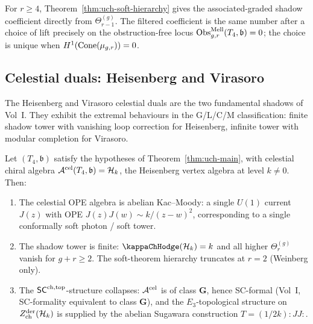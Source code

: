 \begin{remark}
\label{rem:uch-fm103-resolution}
For $r\geq 4$, Theorem~\ref{thm:uch-soft-hierarchy} gives the
associated-graded shadow coefficient directly from
\(\Theta^{(g)}_{r-1}\). The filtered coefficient is the same number
after a choice of lift precisely on the obstruction-free locus
$\operatorname{Obs}^{\mathrm{Mell}}_{g,r}(T_4,\mathfrak b)=0$; the choice is unique
when $H^1(\operatorname{Cone}(\mu_{g,r}))=0$.
\end{remark}

\subsection{Celestial duals: Heisenberg and Virasoro}
\label{subsec:uch-duals}

The Heisenberg and Virasoro celestial duals are the two fundamental
shadows of Vol~I. They exhibit the extremal behaviours in the
G/L/C/M classification: finite shadow tower with vanishing loop correction
for Heisenberg, infinite tower with modular completion for Virasoro.

\begin{proposition}
\label{prop:uch-celestial-heisenberg}
Let $(T_4,\mathfrak b)$ satisfy the hypotheses of
Theorem~\ref{thm:uch-main}, with celestial chiral algebra
$\mathcal A^{\mathrm{cel}}(T_4,\mathfrak b) = \mathcal H_k$, the Heisenberg vertex
algebra at level $k \neq 0$. Then:
\begin{enumerate}[label=\textup{(\roman*)}]
\item The celestial OPE algebra is abelian Kac--Moody: a single
$U(1)$ current $J(z)$ with OPE $J(z)J(w) \sim k/(z-w)^2$,
corresponding to a single conformally soft photon / soft tower.
\item The shadow tower is finite: $\kap(\cH_k) = k$ and all higher
$\Theta^{(g)}_r$ vanish for $g + r \geq 2$. The soft-theorem
hierarchy truncates at $r = 2$ (Weinberg only).
\item The $\mathsf{SC}^{\mathrm{ch,top}}$-structure collapses: $\mathcal A^{\mathrm{cel}}$ is of
class $\mathbf G$, hence SC-formal (Vol~I, SC-formality equivalent
to class $\mathbf G$), and the $E_3$-topological structure on
$Z^{\mathrm{der}}_{\mathrm{ch}}(\mathcal H_k)$ is supplied by the abelian
Sugawara construction $T = (1/2k)\!:\!JJ\!:$.
\end{enumerate}
\end{proposition}


